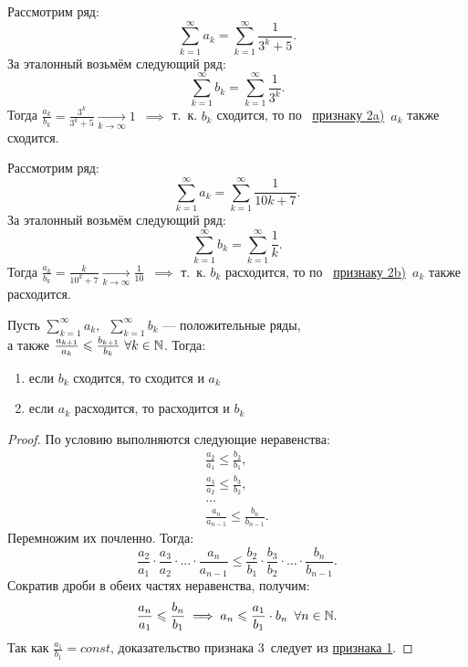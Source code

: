 \documentclass[../../main.tex]{subfiles}
\begin{document}
\begin{example}
	Рассмотрим ряд:
	\[
		 \sum\limits_{k = 1}^\infty a_k=  \sum\limits_{k = 1}^\infty\frac{1}{3^k + 5}
	.\]
	За эталонный возьмём следующий ряд:
	\[
		\sum\limits_{k = 1}^\infty b_k=   \sum\limits_{k = 1}^\infty\frac{1}{3^k}
	.\]
	Тогда $\frac{a_k}{b_k} = \frac{3^k}{3^k + 5} \xrightarrow[k \to \infty]{} 1$\ 
	$\implies$ т.~к. $b_k$ сходится, то по \  
	 \hyperref[lec26:comp_test_2]{признаку  2\textdegree a)}\ $a_k$ также 
	 сходится.
\end{example}
\begin{example}
	Рассмотрим ряд:
	\[
		 \sum\limits_{k = 1}^\infty a_k=  \sum\limits_{k = 1}^\infty\frac{1}{10k + 7}
	.\]
	За эталонный возьмём следующий ряд:
	\[
		\sum\limits_{k = 1}^\infty b_k=   \sum\limits_{k = 1}^\infty\frac{1}{k}
	.\]
	Тогда $\frac{a_k}{b_k} = \frac{k}{10^k + 7} \xrightarrow[k \to \infty]{} 
	\frac{1}{10}$\ 
	$\implies$ т.~к. $b_k$ расходится, то по \  
	 \hyperref[lec26:comp_test_2]{признаку  2\textdegree b)}\ 
	 $a_k$ также расходится.
\end{example}
\begin{thm}[Признак сравнения 3\textdegree]
 	\label{lec26:comp_test_3}
 	Пусть $\sum\limits_{k = 1}^\infty a_k,\enspace \sum\limits_{k = 1}^\infty 
 	b_k$
 	 --- положительные ряды,\\ 
 	а также $\frac{a_{k+1}}{a_k} \leq \frac{b_{k+1}}{b_k} \ 
 	\forall k \in \N$. Тогда:
	\begin{enumerate}[label={\alph*)}]
	\item если  $b_k$ сходится, то сходится и $a_k$
	\item если $a_k$ расходится, то расходится и $b_k$
	\end{enumerate}
\end{thm}
\begin{proof}
	По условию выполняются следующие неравенства:
 	\[
		\begin{array}{l}
			\frac{a_2}{a_1} \leq \frac{b_2}{b_1}, \\
			\frac{a_3}{a_2} \leq \frac{b_3}{b_2}, \\
			\dots\\
			\frac{a_n}{a_{n-1}} \leq \frac{b_n}{b_{n-1}}.
		\end{array}		
	\]
	Перемножим их почленно. Тогда:
	\[
		\frac{a_2}{a_1}\cdot\frac{a_3}{a_2}\cdot\ldots
		\cdot\frac{a_n}{a_{n-1}} \leq
		\frac{b_2}{b_1}\cdot\frac{b_3}{b_2}\cdot\ldots
		\cdot\frac{b_n}{b_{n-1}}
	.\]
	Сократив дроби в обеих частях неравенства, получим:
	\[
		\frac{a_n}{a_1} \leqslant \frac{b_n}{b_1} \implies
		a_n \leqslant \frac{a_1}{b_1}\cdot b_n\enspace \forall n \in \mathbb{N}
	.\]
	Так как $ \frac{a_1}{b_1} = const$, 
	доказательство признака 3\textdegree \ следует из
	\hyperref[lec26:comp_test_1]{признака  1\textdegree}.
\end{proof}
\end{document}

